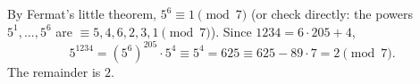 By Fermat's little theorem, $5^6\equiv1\pmod7$ (or check directly: the powers $5^1,\dots,5^6$ are $\equiv5,4,6,2,3,1\pmod7$). Since $1234=6\cdot205+4$,
\[5^{1234}=\left(5^6\right)^{205}\cdot5^4\equiv5^4=625\equiv625-89\cdot7=2\pmod7.\]
The remainder is $\boxed{2}$.
